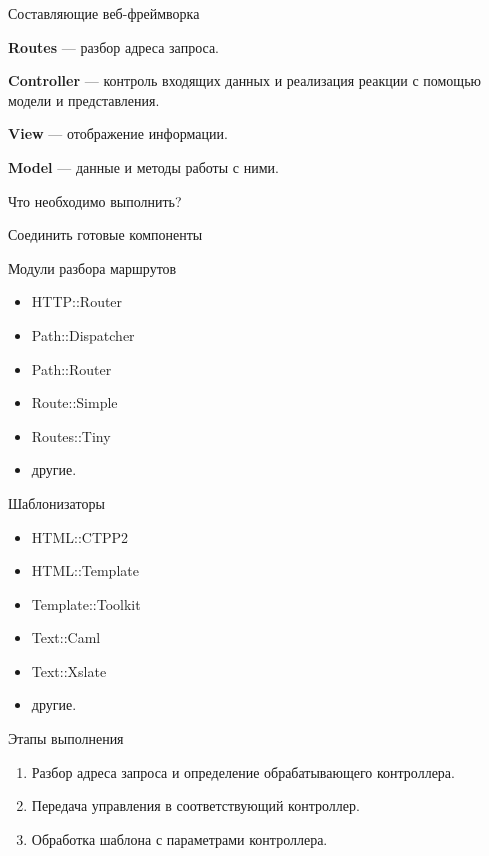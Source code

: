 \documentclass[17pt]{beamer}
\begin{document}
\begin{frame}{Составляющие веб-фреймворка}

{\bf Routes} --- разбор адреса запроса.

{\bf Controller} --- контроль входящих данных и реализация реакции с
помощью модели и представления.

{\bf View} --- отображение информации.

{\bf Model} --- данные и методы работы с ними.

\end{frame}

\begin{frame}{Что необходимо выполнить?}
\begin{center}
\huge Соединить готовые компоненты
\end{center}
\end{frame}

\begin{frame}{Модули разбора маршрутов}
\begin{itemize}
    \item HTTP::Router
    \item Path::Dispatcher
    \item Path::Router
    \item Route::Simple
    \item Routes::Tiny
    \item другие.
\end{itemize}
\end{frame}

\begin{frame}{Шаблонизаторы}
\begin{itemize}
    \item HTML::CTPP2
    \item HTML::Template
    \item Template::Toolkit
    \item Text::Caml
    \item Text::Xslate
    \item другие.
\end{itemize}
\end{frame}

\begin{frame}{Этапы выполнения}
\begin{enumerate}
\item Разбор адреса запроса и определение обрабатывающего контроллера.
\item Передача управления в соответствующий контроллер.
\item Обработка шаблона с параметрами контроллера.
\end{enumerate}
\end{frame}
\end{document}
